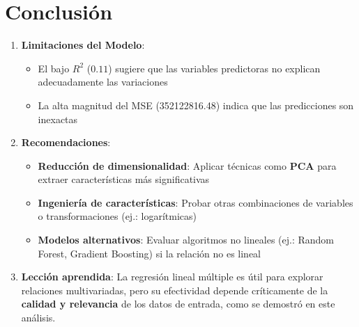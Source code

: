 \documentclass{article}
\begin{document}
\section{Conclusión}
\begin{enumerate}
    \item \textbf{Limitaciones del Modelo}:
    \begin{itemize}
        \item El bajo $R^2$ ($0.11$) sugiere que las variables predictoras no explican adecuadamente las variaciones
        \item La alta magnitud del MSE (\num{352122816.48}) indica que las predicciones son inexactas
    \end{itemize}
    
    \item \textbf{Recomendaciones}:
    \begin{itemize}
        \item \textbf{Reducción de dimensionalidad}: Aplicar técnicas como \textbf{PCA} para extraer características más significativas
        \item \textbf{Ingeniería de características}: Probar otras combinaciones de variables o transformaciones (ej.: logarítmicas)
        \item \textbf{Modelos alternativos}: Evaluar algoritmos no lineales (ej.: Random Forest, Gradient Boosting) si la relación no es lineal
    \end{itemize}
    
    \item \textbf{Lección aprendida}:
    La regresión lineal múltiple es útil para explorar relaciones multivariadas, pero su efectividad depende críticamente de la \textbf{calidad y relevancia} de los datos de entrada, como se demostró en este análisis.
\end{enumerate}
\end{document}
